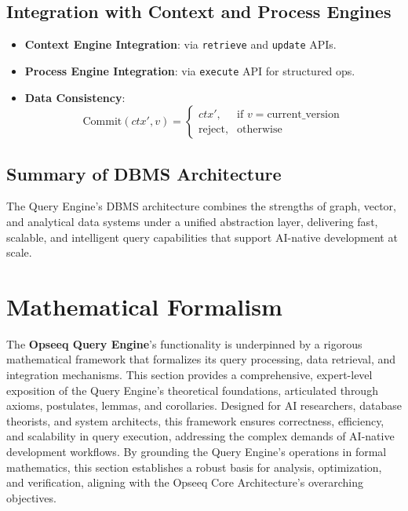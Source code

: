 \documentclass[11pt]{article}
\begin{document}
\subsection{Integration with Context and Process Engines}
\label{subsec:dbms_integration}

\begin{itemize}
    \item \textbf{Context Engine Integration}: via \texttt{retrieve} and \texttt{update} APIs.

    \item \textbf{Process Engine Integration}: via \texttt{execute} API for structured ops.

    \item \textbf{Data Consistency}:
    \[
    \text{Commit}(ctx', v) = 
    \begin{cases}
        ctx', & \text{if } v = \text{current\_version} \\
        \text{reject}, & \text{otherwise}
    \end{cases}
    \]
\end{itemize}

\subsection{Summary of DBMS Architecture}

The Query Engine’s DBMS architecture combines the strengths of graph, vector, and analytical data systems under a unified abstraction layer, delivering fast, scalable, and intelligent query capabilities that support AI-native development at scale.


\section{Mathematical Formalism}
\label{sec:math}

The \textbf{Opseeq Query Engine}'s functionality is underpinned by a rigorous mathematical framework that formalizes its query processing, data retrieval, and integration mechanisms. This section provides a comprehensive, expert-level exposition of the Query Engine’s theoretical foundations, articulated through axioms, postulates, lemmas, and corollaries. Designed for AI researchers, database theorists, and system architects, this framework ensures correctness, efficiency, and scalability in query execution, addressing the complex demands of AI-native development workflows. By grounding the Query Engine’s operations in formal mathematics, this section establishes a robust basis for analysis, optimization, and verification, aligning with the Opseeq Core Architecture’s overarching objectives.
\end{document}
